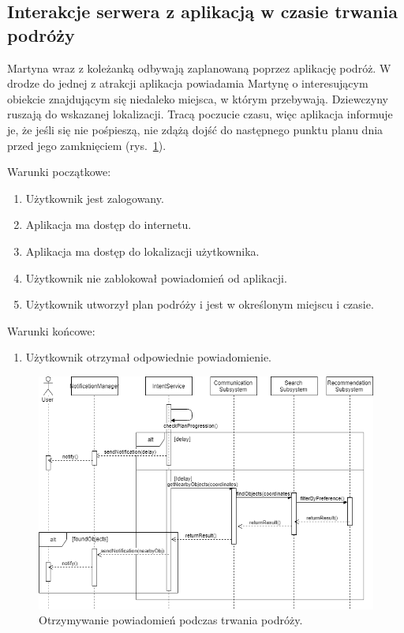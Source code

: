 \documentclass[10pt,twoside,a4paper]{report}
\begin{document}
\subsection{Interakcje serwera z aplikacją w czasie trwania podróży}
\par Martyna wraz z koleżanką odbywają zaplanowaną poprzez aplikację podróż. W drodze do jednej z atrakcji aplikacja powiadamia Martynę o interesującym obiekcie znajdującym się niedaleko miejsca, w którym przebywają. Dziewczyny ruszają do wskazanej lokalizacji. Tracą poczucie czasu, więc aplikacja informuje je, że jeśli się nie pośpieszą, nie zdążą dojść do następnego punktu planu dnia przed jego zamknięciem (rys.~\ref{fig:whileTravelling}).

\noindent\newline Warunki początkowe:
\begin{enumerate}
  \item Użytkownik jest zalogowany.
  \item Aplikacja ma dostęp do internetu.
  \item Aplikacja ma dostęp do lokalizacji użytkownika.
  \item Użytkownik nie zablokował powiadomień od aplikacji.
  \item Użytkownik utworzył plan podróży i jest w określonym miejscu i czasie.
\end{enumerate}
\par
\noindent\newline
Warunki końcowe:
\begin{enumerate}
  \item Użytkownik otrzymał odpowiednie powiadomienie.
\end{enumerate}

\noindent\newline
\begin{figure}[h]
\centering
\includegraphics[width=\linewidth]{whileTravelling}
\caption{Otrzymywanie powiadomień podczas trwania podróży.}
\label{fig:whileTravelling}
\end{figure}
\end{document}
